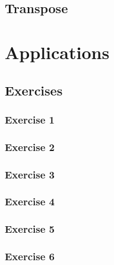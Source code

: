 \documentclass[12px,oz]{report}
\begin{document}
	\section{Transpose}
	\label{sec-transpose}
	
	
\chapter{Applications}
\label{ch-app}

	\section{Exercises}
	
		\subsection{Exercise 1}
		
		\subsection{Exercise 2}
		
		\subsection{Exercise 3}
		
		\subsection{Exercise 4}
		
		
		\subsection{Exercise 5}
		
		\subsection{Exercise 6}
	

\cite{McCool2012}
\cite{udacity:parallel}



\end{document}
